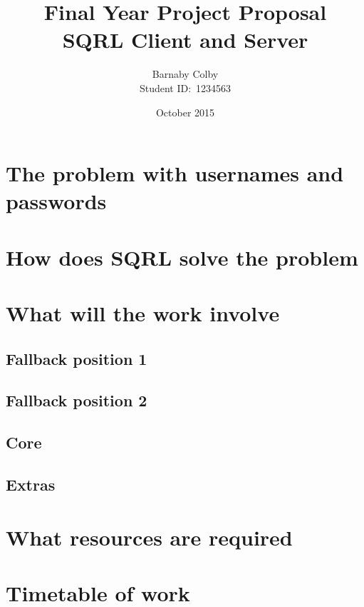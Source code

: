 \documentclass[a4paper]{article}
\begin{document}
\title{Final Year Project Proposal\\SQRL Client and Server}
\author{Barnaby Colby\\
Student ID:\ 1234563}
\date{October 2015}
\maketitle



\section*{The problem with usernames and passwords} 
\section*{How does SQRL solve the problem} 
\section*{What will the work involve}
    \subsection*{Fallback position 1}
    \subsection*{Fallback position 2}
    \subsection*{Core}
    \subsection*{Extras}
\section*{What resources are required}
\section*{Timetable of work}
\end{document}
